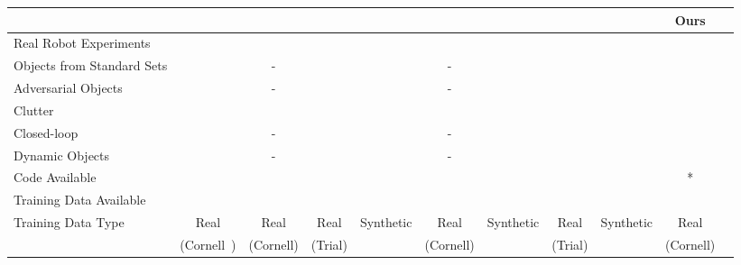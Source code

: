 \documentclass[conference]{IEEEtran}
\newcommand{\yes}{\textcolor{ForestGreen}{}}
\newcommand{\no}{\textcolor{red}{}}
\begin{document}
\begin{table*}[t!]
    \begin{center}
        \vspace{-3mm}
        \begin{tabular}{@{}lcccccccccc@{}}
        \toprule
        & \cite{Lenz2015DeepGrasps} & \cite{Redmon2015Real-timeNetworks} & \cite{Pinto2016SupersizingHours} & \cite{Johns2016DeepUncertainty} & \cite{Kumra2017RoboticNetworks} & \cite{Mahler2017Dex2} & \cite{Levine2017LearningCollection} & \cite{Viereck2017LearningImages} & \textbf{Ours} \\
        \midrule
        
        Real Robot Experiments             & \yes & \no  & \yes & \yes & \no  & \yes & \yes & \yes & \yes \\
        Objects from Standard Sets         & \no  & -    & \no  & \no  & -    & \no  & \no  & \no  & \yes \\
        Adversarial Objects~\cite{Mahler2017Dex2}
                                           & \no  & -    & \no  & \no  & -    & \yes & \no  & \no  & \yes \\
        Clutter                            & \no  & \no  & \yes & \no  & \no  & \no  & \yes & \yes & \yes \\
        Closed-loop                        & \no  & -    & \no  & \no  & -    & \no  & \yes & \yes & \yes \\
        Dynamic Objects                    & \no  & -    & \no  & \no  & -    & \no  & \no  & \yes & \yes \\
        Code Available                     & \yes & \no  & \yes & \no  & \no  & \yes & \no  & \no  & \yes* \\
        Training Data Available            & \yes & \yes & \yes & \no  & \yes & \yes & \yes & \no  & \yes \\
        Training Data Type                 & Real & Real & Real & Synthetic 
                                                                       & Real & Synthetic
                                                                                     & Real & Synthetic
                                                                                                   & Real \\
                                           & (Cornell~\cite{Lenz2015DeepGrasps}) 
                                                  & (Cornell) 
                                                         &(Trial)&      & (Cornell)
                                                                              &      &(Trial)&      & (Cornell)\\
        

\end{tabular}
\end{center}
\end{table*}
\end{document}
